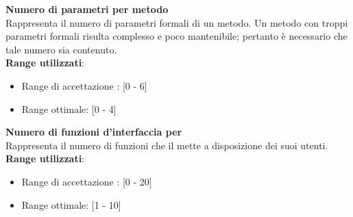 \textbf{Numero di parametri per metodo}\\

Rappresenta il numero di parametri formali di un metodo. Un metodo con troppi parametri formali risulta complesso e poco mantenibile; pertanto è necessario che tale numero sia contenuto. \\

\textbf{Range utilizzati}:
\begin{itemize}
	\item Range di accettazione : [0 - 6]
	\item Range ottimale: [0 - 4]
\end{itemize}

\textbf{Numero di funzioni d'interfaccia per }\\

Rappresenta il numero di funzioni che il  mette a disposizione dei suoi utenti. \\

\textbf{Range utilizzati}:
\begin{itemize}
	\item Range di accettazione : [0 - 20]
	\item Range ottimale: [1 - 10]
\end{itemize}
